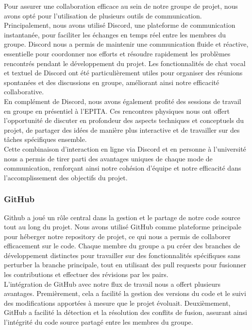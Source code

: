 Pour assurer une collaboration efficace au sein de notre groupe de projet, nous avons opté pour l'utilisation de plusieurs outils de communication.
Principalement, nous avons utilisé Discord, une plateforme de communication instantanée, pour faciliter les échanges en temps réel entre les membres du groupe.
Discord nous a permis de maintenir une communication fluide et réactive, essentielle pour coordonner nos efforts et résoudre rapidement les problèmes rencontrés
pendant le développement du projet.
Les fonctionnalités de chat vocal et textuel de Discord ont été particulièrement utiles pour organiser des réunions spontanées et des discussions en groupe,
améliorant ainsi notre efficacité collaborative.
\\

En complément de Discord, nous avons également profité des sessions de travail en groupe en présentiel à l'EPITA.
Ces rencontres physiques nous ont offert l'opportunité de discuter en profondeur des aspects techniques et conceptuels du projet,
de partager des idées de manière plus interactive et de travailler sur des tâches spécifiques ensemble.
\\

Cette combinaison d'interaction en ligne via Discord et en personne à l'université nous a permis de tirer parti des avantages uniques de chaque mode de communication,
renforçant ainsi notre cohésion d'équipe et notre efficacité dans l'accomplissement des objectifs du projet.
\\



\subsubsection{GitHub}

Github a joué un rôle central dans la gestion et le partage de notre code source tout au long du projet.
Nous avons utilisé GitHub comme plateforme principale pour héberger notre repository de projet, ce qui nous a permis de collaborer efficacement sur le code.
Chaque membre du groupe a pu créer des branches de développement distinctes pour travailler sur des fonctionnalités spécifiques sans perturber la branche principale, tout en utilisant des pull requests pour fusionner les contributions et effectuer des révisions par les pairs.
\\

L'intégration de GitHub avec notre flux de travail nous a offert plusieurs avantages.
Premièrement, cela a facilité la gestion des versions du code et le suivi des modifications apportées à mesure que le projet évoluait.
Deuxièmement, GitHub a facilité la détection et la résolution des conflits de fusion, assurant ainsi l'intégrité du code source partagé entre les membres du groupe.
\\
